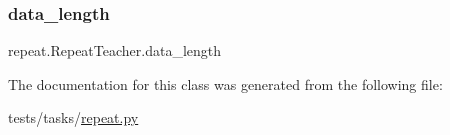 \subsubsection{\texorpdfstring{data\+\_\+length}{data\_length}}
{\footnotesize\ttfamily repeat.\+Repeat\+Teacher.\+data\+\_\+length}



The documentation for this class was generated from the following file\+:\begin{DoxyCompactItemize}
\item 
tests/tasks/\hyperlink{repeat_8py}{repeat.\+py}\end{DoxyCompactItemize}
